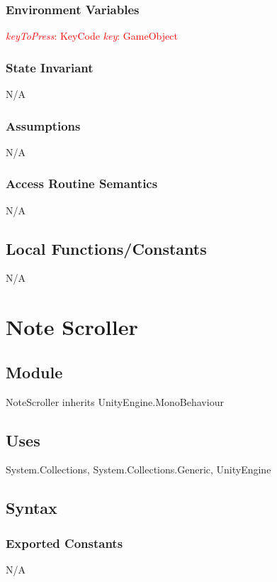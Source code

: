\documentclass[12pt]{article}
\begin{document}
\subsubsection {Environment Variables}
\textcolor{red}{\textit{keyToPress}: KeyCode}
\textcolor{red}{\textit{key}: GameObject}

\subsubsection {State Invariant}
N/A

\subsubsection {Assumptions}
N/A

\subsubsection {Access Routine Semantics}
N/A

\subsection{Local Functions/Constants}
N/A

\medskip

\newpage
\section{Note Scroller}

\subsection{Module}
NoteScroller inherits UnityEngine.MonoBehaviour

\subsection {Uses}
System.Collections, System.Collections.Generic, UnityEngine

\subsection {Syntax}

\subsubsection {Exported Constants}
N/A
\end{document}
